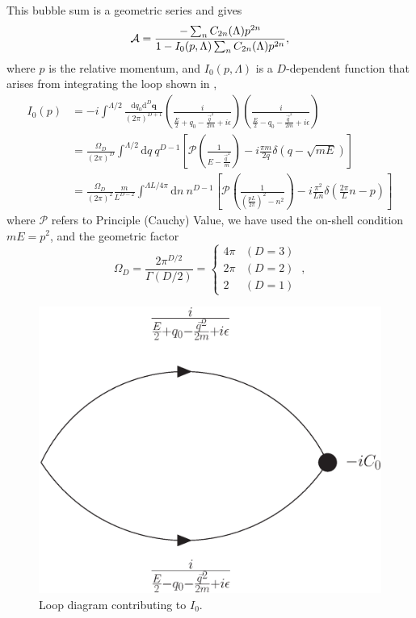 This bubble sum is a geometric series and gives\cite{Kaplan:1998we,Beane:2003da}
\begin{equation}\label{eq:scattering amplitude}
\mathcal{A} = \frac{-\sum_n C_{2n}(\Lambda) p^{2n}}{1-I_0(p,\Lambda) \sum_n C_{2n}(\Lambda) p^{2n}},
\end{equation}
where $p$ is the relative momentum,  and $I_0(p,\Lambda)$ is a $D$-dependent function that arises from integrating the loop shown in ,
\begin{align}
    I_0(p)
    &=-i\int^{\Lambda/2} \frac { \mathrm {d}q_0 \mathrm { d } ^ { D } \mathbf { q } } { ( 2 \pi ) ^ { D+1 } } \left( \frac { i } { \frac{E}{2} + q _ { 0 } - \frac{\vec{q}^2}{2m} + i \epsilon } \right) \left( \frac { i } { \frac{E}{2} - q _ { 0 } - \frac{\vec{q}^2}{2m} + i \epsilon } \right)
    \nonumber\\
    &=\frac{\Omega_D}{(2\pi)^D}\int^{\Lambda/2}  \mathrm { d } q \ q^{D-1}\left[\mathcal{P} \left( \frac { 1 } { E - \frac{\vec{q}^2}{m} } \right)
-i\frac{\pi m}{2q}\delta(q-\sqrt{mE})\right]
    \\
    &=\frac{\Omega_D}{(2\pi)^2}\frac{m}{L^{D-2}}\int^{\Lambda L/4\pi}  \mathrm { d } n \ n^{D-1}\left[\mathcal{P} \left( \frac { 1 } { \left(\frac{pL}{2\pi}\right)^2 - n^2 } \right)
-i\frac{\pi^2}{L n}\delta\left(\frac{2\pi}{L}n -p\right)\right]
    \label{eq:I0}
\end{align}
where $\mathcal{P}$ refers to Principle (Cauchy) Value, we have used the on-shell condition $mE=p^2$, and the geometric factor
\begin{equation}
\Omega_D=\frac{2\pi^{D/2}}{\Gamma(D/2)}=
    \begin{cases}
        4\pi    &   (D=3)\\
        2\pi    &   (D=2)\\
        2       &   (D=1)
    \end{cases}\ ,
\end{equation}

\begin{figure}[h!]
\center
\includegraphics[width=.35\columnwidth]{figure/I0.eps}
\caption{Loop diagram contributing to $I_0$.\label{fig:I0} }
\end{figure}

